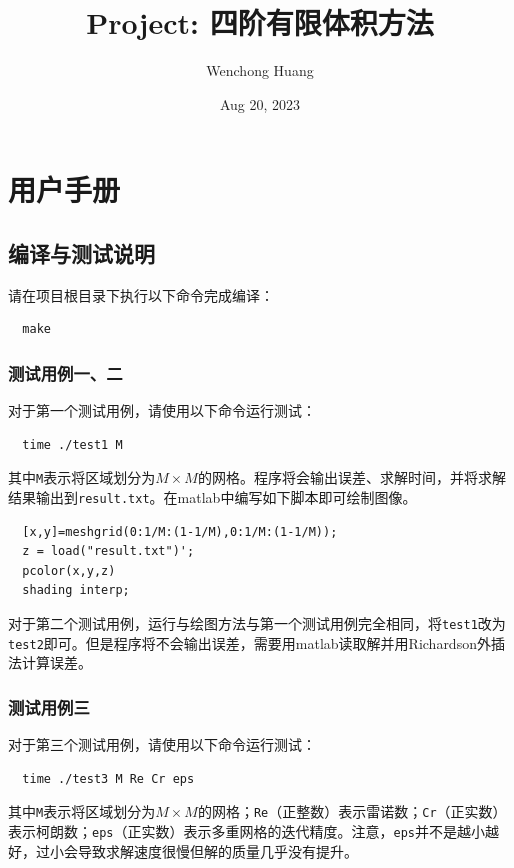 \documentclass[lang=cn,10pt,bibend=bibtex]{elegantbook}
\title{Project: 四阶有限体积方法}
\author{Wenchong Huang}
\date{Aug 20, 2023}
\begin{document}
\maketitle
\frontmatter

\tableofcontents

\mainmatter

\chapter{用户手册}

\section{编译与测试说明}

请在项目根目录下执行以下命令完成编译：
\begin{lstlisting}
  make
\end{lstlisting}

\subsection{测试用例一、二}

对于第一个测试用例，请使用以下命令运行测试：
\begin{lstlisting}
  time ./test1 M
\end{lstlisting}

其中\verb|M|表示将区域划分为$M\times M$的网格。程序将会输出误差、求解时间，并将求解结果输出到\verb|result.txt|。在matlab中编写如下脚本即可绘制图像。
\begin{lstlisting}
  [x,y]=meshgrid(0:1/M:(1-1/M),0:1/M:(1-1/M));
  z = load("result.txt")';
  pcolor(x,y,z)
  shading interp;
\end{lstlisting}

对于第二个测试用例，运行与绘图方法与第一个测试用例完全相同，将\verb|test1|改为\verb|test2|即可。但是程序将不会输出误差，需要用matlab读取解并用Richardson外插法计算误差。

\subsection{测试用例三}

对于第三个测试用例，请使用以下命令运行测试：
\begin{lstlisting}
  time ./test3 M Re Cr eps
\end{lstlisting}

其中\verb|M|表示将区域划分为$M\times M$的网格；\verb|Re|（正整数）表示雷诺数；\verb|Cr|（正实数）表示柯朗数；\verb|eps|（正实数）表示多重网格的迭代精度。注意，\verb|eps|并不是越小越好，过小会导致求解速度很慢但解的质量几乎没有提升。
\end{document}
